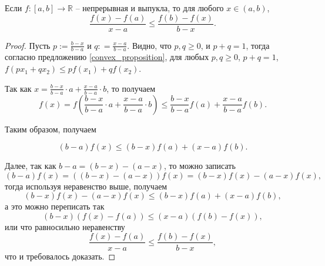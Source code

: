 \begin{corollary}\label{cor_for_convex}
    Если $f:[a,b] \to \mathbb{R}$ -- непрерывная и выпукла, то для любого $x \in (a,b)$,
    \[
     \frac{f(x) - f(a)}{x-a} \le \frac{f(b) - f(x)}{b-x}.
    \]
\end{corollary}
\begin{proof}
Пусть $p:= \frac{b-x}{b-a}$ и $q: = \frac{x-a}{b-a}$. Видно, что $p,q \ge 0$, и $p+q=1$, тогда согласно предложению \ref{convex_proposition}, для любых $p,q \ge 0$, $p+q=1$, $f(px_1 + qx_2) \le pf(x_1) + qf(x_2)$.

Так как $x = \frac{b-x}{b-a} \cdot a + \frac{x-a}{b-a}\cdot b$, то получаем
\[
 f(x) = f\left(  \frac{b-x}{b-a} \cdot a + \frac{x-a}{b-a}\cdot b\right) \le \frac{b-x}{b-a} f(a) + \frac{x-a}{b-a}f(b).
\]

Таким образом, получаем

\[
 (b-a)f(x) \le (b-x) f(a) + (x-a) f(b).
\]

Далее, так как $b-a = (b-x) - (a-x)$, то можно записать
\[
 (b-a) f(x) = \left( (b-x) - (a-x) \right) f(x) = (b-x)f(x) - (a-x)f(x),
\]
тогда используя неравенство выше, получаем
\[
 (b-x)f(x) - (a-x)f(x) \le (b-x) f(a) + (x-a) f(b),
\]
а это можно переписать так
\[
 (b-x) (f(x) - f(a)) \le (x-a) (f(b) - f(x)),
\]
или что равносильно неравенству 
 \[
     \frac{f(x) - f(a)}{x-a} \le \frac{f(b) - f(x)}{b-x},
    \]
что и требовалось доказать.
\end{proof}

